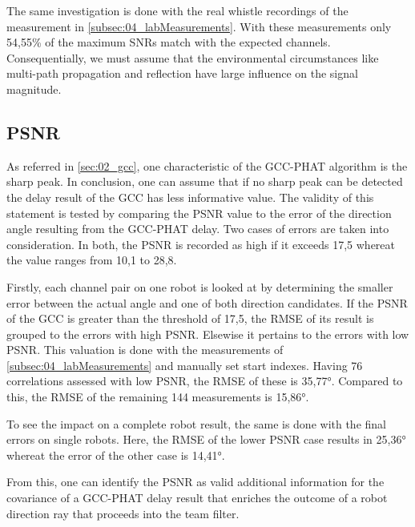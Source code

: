 The same investigation is done with the real whistle recordings of the
measurement in \ref{subsec:04_labMeasurements}.
With these measurements only 54,55\si{\percent} of the maximum \acp{SNR}
match with the expected channels.
Consequentially, we must assume that the environmental circumstances
like multi-path propagation and reflection have large influence
on the signal magnitude.

\subsection{PSNR}
\label{subsec:04_psnr}

As referred in \cref{sec:02_gcc}, one characteristic of the \ac{GCC-PHAT}
algorithm is the sharp peak.
In conclusion, one can assume that if no sharp peak can be detected the
delay result of the \ac{GCC} has less informative value.
The validity of this statement is tested by comparing the \ac{PSNR} value
to the error of the direction angle resulting from the \ac{GCC-PHAT} delay.
Two cases of errors are taken into consideration.
In both, the \ac{PSNR} is recorded as high if it exceeds 17,5 whereat the
value ranges from 10,1 to 28,8.

Firstly, each channel pair on one robot is looked at by determining the
smaller error between the actual angle and one of both direction candidates.
If the \ac{PSNR} of the \ac{GCC} is greater than the threshold of 17,5,
the \ac{RMSE} of its result is grouped to the errors with high \ac{PSNR}.
Elsewise it pertains to the errors with low \ac{PSNR}.
This valuation is done with the measurements of \cref{subsec:04_labMeasurements}
and manually set start indexes.
Having 76 correlations assessed with low \ac{PSNR}, the \ac{RMSE} of these
is 35,77\si{\degree}.
Compared to this, the \ac{RMSE} of the remaining 144 measurements
is 15,86\si{\degree}.

To see the impact on a complete robot result, the same is done
with the final errors on single robots.
Here, the \ac{RMSE} of the lower \ac{PSNR} case results in 25,36\si{\degree}
whereat the error of the other case is 14,41\si{\degree}.

From this, one can identify the \ac{PSNR} as valid additional information
for the covariance of a \ac{GCC-PHAT} delay result that enriches the
outcome of a robot direction ray that proceeds into the team filter.
